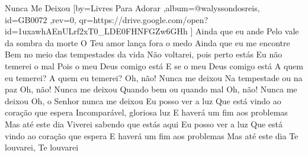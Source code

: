 \beginsong
{Nunca Me Deixou %
}[by={Livres Para Adorar %
},album={@walyssondosreis},
id={GB0072 %
},rev={0}, %
qr={https://drive.google.com/open?id=1uxawhAEnULrf2xT0_LDE0FHNFGZw6GHh %
}]
\beginverse*
Ainda que eu ande
Pelo vale da sombra da morte
O Teu amor lança fora o medo
Ainda que eu me encontre
Bem no meio das tempestades da vida
Não voltarei, pois perto estás
\endverse
\beginverse*
Eu não temerei o mal
Pois o meu Deus comigo está
E se o meu Deus comigo está
A quem eu temerei? A quem eu temerei?
\endverse
\beginchorus
Oh, não! Nunca me deixou
Na tempestade ou na paz
Oh, não! Nunca me deixou
Quando bem ou quando mal
Oh, não! Nunca me deixou
Oh, o Senhor nunca me deixou
\endchorus
\beginverse*
Eu posso ver a luz
Que está vindo ao coração que espera
Incomparável, gloriosa luz
E haverá um fim aos problemas
Mas até este dia
Viverei sabendo que estás aqui
\endverse
\beginverse*
Eu posso ver a luz
Que está vindo ao coração que espera
E haverá um fim aos problemas
Mas até este dia
Te louvarei, Te louvarei
\endverse
\vspace{4em} %
\begin{comment}
\lstset{basicstyle=\scriptsize\bf} %
\tab{Solo 1}
\begin{lstlisting}
E|-----------------------------------------------------|
B|-----------------------------------------------------|
G|-----------------------------------------------------|
D|-----------------------------------------------------|
A|-----------------------------------------------------|
E|-----------------------------------------------------|
\end{lstlisting}
\end{comment}
 
